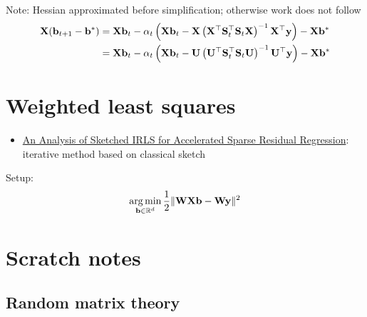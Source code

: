 \documentclass[10pt]{article}
\begin{document}
Note: Hessian approximated before simplification; otherwise work does not follow
\begin{align*}
\mathbf{X}(\mathbf{b}_{t+1}-\mathbf{b}^*) &= \mathbf{X}\mathbf{b}_t - \alpha_t\left(\mathbf{X}\mathbf{b}_t-\mathbf{X}\left(\mathbf{X}^\top\mathbf{S}_t^\top\mathbf{S}_t\mathbf{X}\right)^{-1}\mathbf{X}^\top\mathbf{y}\right) - \mathbf{X}\mathbf{b}^* \\
&= \mathbf{X}\mathbf{b}_t - \alpha_t\left(\mathbf{X}\mathbf{b}_t-\mathbf{U}\left(\mathbf{U}^\top\mathbf{S}_t^\top\mathbf{S}_t\mathbf{U}\right)^{-1}\mathbf{U}^\top\mathbf{y}\right) - \mathbf{X}\mathbf{b}^*
\end{align*}



\newpage



\section{Weighted least squares}

\begin{itemize}
\item
\href{https://www.ecva.net/papers/eccv_2020/papers_ECCV/papers/123570596.pdf}{An Analysis of Sketched IRLS for Accelerated Sparse Residual Regression}: iterative method based on classical sketch
\end{itemize}
Setup:
\[
\operatorname*{arg\,min}_{\mathbf{b}\in\mathbb{R}^d} \frac{1}{2}\|\mathbf{W}\mathbf{X}\mathbf{b}-\mathbf{W}\mathbf{y}\|^2
\]



\newpage



\section{Scratch notes}

\subsection{Random matrix theory}
\end{document}

